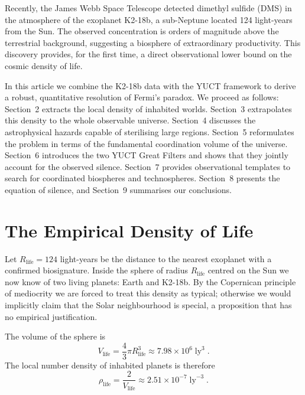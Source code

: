 \documentclass[12pt,a4paper]{article}
\begin{document}
	Recently, the James Webb Space Telescope detected dimethyl sulfide
	(DMS) in the atmosphere of the exoplanet K2-18b, a sub-Neptune located
	124 light-years from the Sun.  The observed concentration is orders of
	magnitude above the terrestrial background, suggesting a biosphere of
	extraordinary productivity.  This discovery provides, for the first
	time, a direct observational lower bound on the cosmic density of life.
	
	In this article we combine the K2-18b data with the YUCT framework to
	derive a robust, quantitative resolution of Fermi's paradox.  We
	proceed as follows:  Section~2 extracts the local density of inhabited
	worlds.  Section~3 extrapolates this density to the whole observable
	universe.  Section~4 discusses the astrophysical hazards capable of
	sterilising large regions.  Section~5 reformulates the problem in terms
	of the fundamental coordination volume of the universe.  Section~6
	introduces the two YUCT Great Filters and shows that they jointly
	account for the observed silence.  Section~7 provides observational
	templates to search for coordinated biospheres and technospheres.
	Section~8 presents the equation of silence, and Section~9 summarises
	our conclusions.
	
	\section{The Empirical Density of Life}
	\label{sec:empirical}
	Let $R_{\mathrm{life}} = 124$ light-years be the distance to the
	nearest exoplanet with a confirmed biosignature.  Inside the sphere of
	radius $R_{\mathrm{life}}$ centred on the Sun we now know of two living
	planets: Earth and K2-18b.  By the Copernican principle of mediocrity
	we are forced to treat this density as typical; otherwise we would
	implicitly claim that the Solar neighbourhood is special, a
	proposition that has no empirical justification.
	
	The volume of the sphere is
	\begin{equation}
		V_{\mathrm{life}} = \frac{4}{3}\pi R_{\mathrm{life}}^{3}
		\approx 7.98\times 10^{6}\;\mathrm{ly}^{3}\;.
	\end{equation}
	The local number density of inhabited planets is therefore
	\begin{equation}
		\rho_{\mathrm{life}} = \frac{2}{V_{\mathrm{life}}}
		\approx 2.51\times 10^{-7}\;\mathrm{ly}^{-3}\;.
	\end{equation}
	
\end{document}
